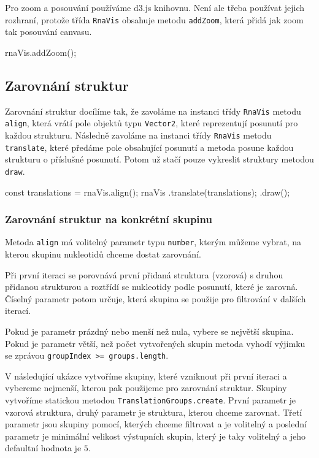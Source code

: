 Pro zoom a posouvání používáme d3.js knihovnu. Není ale třeba používat jejich
rozhraní, protože třída \texttt{RnaVis} obsahuje metodu \texttt{addZoom}, která
přidá jak zoom tak posouvání canvasu.

\begin{code}
rnaVis.addZoom();
\end{code}

\subsection{Zarovnání struktur}

Zarovnání struktur docílíme tak, že zavoláme na instanci třídy \texttt{RnaVis}
metodu \texttt{align}, která vrátí pole objektů typu \texttt{Vector2}, které
reprezentují posunutí pro každou strukturu. Následně zavoláme na instanci třídy
\texttt{RnaVis} metodu \texttt{translate}, které předáme pole obsahující
posunutí a metoda posune každou strukturu o příslušné posunutí. Potom už stačí pouze vykreslit struktury metodou \texttt{draw}.

\begin{code}
const translations = rnaVis.align();
rnaVis
  .translate(translations);
  .draw();
\end{code}

\subsubsection{Zarovnání struktur na konkrétní skupinu}

Metoda \texttt{align} má volitelný parametr typu \texttt{number}, kterým můžeme
vybrat, na kterou skupinu nukleotidů chceme dostat zarovnání.

Při první iteraci se porovnává první přidaná struktura (vzorová) s druhou
přidanou strukturou a roztřídí se nukleotidy podle posunutí, které je zarovná.
Číselný parametr potom určuje, která skupina se použije pro filtrování v
dalších iterací. 

Pokud je parametr prázdný nebo menší než nula, vybere se největší skupina.
Pokud je parametr větší, než počet vytvořených skupin metoda vyhodí výjimku se
zprávou \texttt{groupIndex >= groups.length}. 

V následující ukázce vytvoříme skupiny, které vzniknout při první iteraci a
vybereme nejmenší, kterou pak použijeme pro zarovnání struktur. Skupiny
vytvoříme statickou metodou \texttt{TranslationGroups.create}. První parametr
je vzorová struktura, druhý parametr je struktura, kterou chceme zarovnat.
Třetí parametr jsou skupiny pomocí, kterých chceme filtrovat a je volitelný a
poslední parametr je minimální velikost výstupních skupin, který je taky
volitelný a jeho defaultní hodnota je $5$.

